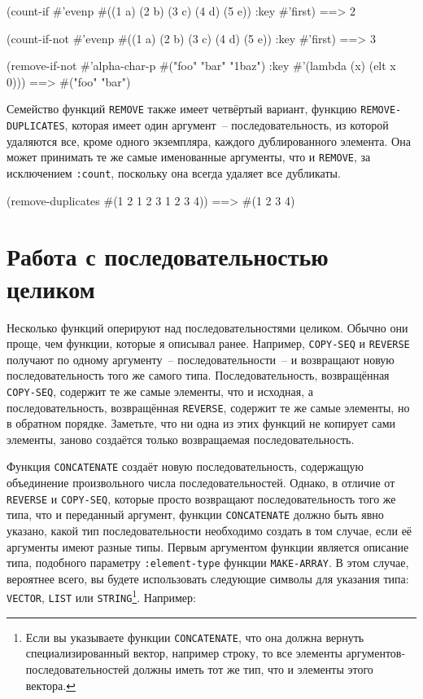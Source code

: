 \begin{myverb}
  (count-if #'evenp #((1 a) (2 b) (3 c) (4 d) (5 e)) :key #'first)     ==> 2

  (count-if-not #'evenp #((1 a) (2 b) (3 c) (4 d) (5 e)) :key #'first) ==> 3

  (remove-if-not #'alpha-char-p
    #("foo" "bar" "1baz") :key #'(lambda (x) (elt x 0))) ==> #("foo" "bar")
\end{myverb}

Семейство функций \lstinline{REMOVE} также имеет четвёртый вариант, функцию
\lstinline{REMOVE-DUPLICATES}, которая имеет один аргумент~-- последовательность, из которой
удаляются все, кроме одного экземпляра, каждого дублированного элемента.  Она может
принимать те же самые именованные аргументы, что и \lstinline{REMOVE}, за исключением
\lstinline{:count}, поскольку она всегда удаляет все дубликаты.

\begin{myverb}
  (remove-duplicates #(1 2 1 2 3 1 2 3 4)) ==> #(1 2 3 4)
\end{myverb}

\section{Работа с последовательностью целиком}

Несколько функций оперируют над последовательностями целиком.  Обычно
они проще, чем функции, которые я описывал ранее.  Например,
\lstinline{COPY-SEQ} и \lstinline{REVERSE} получают по одному аргументу~-- последовательности~-- и
возвращают новую последовательность того же самого типа.  Последовательность, возвращённая
\lstinline{COPY-SEQ}, содержит те же самые элементы, что и исходная,
а последовательность, возвращённая \lstinline{REVERSE}, содержит те же
самые элементы, но в обратном порядке.  Заметьте, что ни одна из этих функций не копирует
сами элементы, заново создаётся только возвращаемая последовательность.

Функция \lstinline{CONCATENATE} создаёт новую последовательность, содержащую объединение произвольного
числа последовательностей.  Однако, в отличие от \lstinline{REVERSE} и \lstinline{COPY-SEQ}, которые
просто возвращают последовательность того же типа, что и переданный аргумент, функции
\lstinline{CONCATENATE} должно быть явно указано, какой тип последовательности необходимо
создать в том случае, если её аргументы имеют разные типы.  Первым аргументом функции
является описание типа, подобного параметру \lstinline{:element-type} функции \lstinline{MAKE-ARRAY}.
В этом случае, вероятнее всего, вы будете использовать следующие символы для указания типа:
\lstinline{VECTOR}, \lstinline{LIST} или \lstinline{STRING}\footnote{Если вы указываете функции
  \lstinline{CONCATENATE}, что она должна вернуть специализированный вектор, например строку,
  то все элементы аргументов-последовательностей должны иметь тот же тип, что и элементы
  этого вектора.}.  Например:

